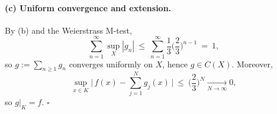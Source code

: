 \documentclass[12pt,a4paper]{article}
\newcommand{\qed}{\hfill$\square$}
\theoremstyle{plain}
\theoremstyle{definition}
\theoremstyle{remark}
\theoremstyle{remark}
\begin{document}
\medskip

\paragraph{(c) Uniform convergence and extension.}
By (b) and the Weierstrass M-test,
\[
\sum_{n=1}^\infty \sup_X|g_n|
\ \le\ 
\sum_{n=1}^\infty \frac{1}{3}\Big(\frac{2}{3}\Big)^{n-1}
\ =\ 1,
\]
so $g:=\sum_{n\ge1} g_n$ converges uniformly on $X$, hence $g\in C(X)$.
Moreover,
\[
\sup_{x\in K}\Big|\,f(x)-\sum_{j=1}^{N} g_j(x)\,\Big|\ \le\ \Big(\frac{2}{3}\Big)^{N}\xrightarrow[N\to\infty]{}0,
\]
so $g|_K=f$. \qed

	
	

	
	
\end{document}
